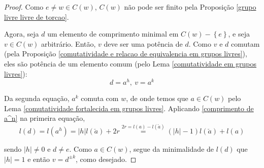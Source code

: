 	\begin{proof}
		Como $e\neq w\in C(w)$, $C(w)$ não pode ser finito pela Proposição \eqref{grupo livre livre de torcao}.
		\par\vspace{0.3cm} Agora, seja $d$ um elemento de comprimento minimal	em $C(w) - \left\{ e \right\}$, e seja $v\in C(w)$ arbitrário. Então, $v$ deve ser uma potência de $d$. Como $v$ e $d$ comutam (pela Proposição \eqref{comutatividade e relacao de equivalencia em grupos livres}), eles são potência de um elemento comum (pelo Lema \eqref{comutatividade em grupos livres}):
		\begin{equation*}
		d = a^h, \ v = a^k
		\end{equation*}
		\par\vspace{0.3cm} Da segunda equação, $a^k$ comuta com $w$, de onde temos que $a\in C(w)$ pelo Lema \eqref{comutatividade fortalecida em grupos livres}. Aplicando \eqref{comprimento de a^n} na primeira equação, 
		\begin{equation*}
		l(d) = l(a^h) = |h|l(\check{a}) + 2r \stackrel{2r = l(a) - l(\check{a})}{=} (|h| - 1)l(\check{a}) + l(a)
		\end{equation*}
		\par\vspace{0.3cm} sendo $|h|\neq 0$ e $d\neq e$. Como $a\in C(w)$, segue da minimalidade de $l(d)$ que $|h| = 1$ e então $v = d^{\pm k}$, como desejado.
	\end{proof}
	
	
